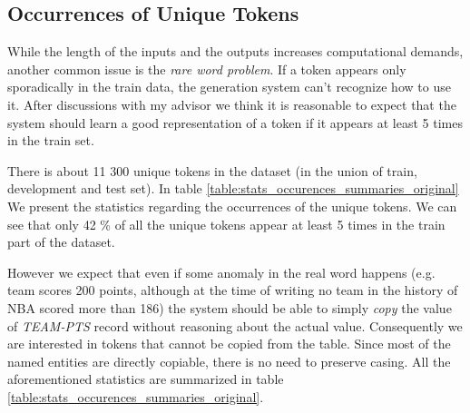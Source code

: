 \begin{table}[h!]
    \centering
    \caption{Statistics of summaries as used by \citet{wiseman2017}} \label{table:stats_length_summaries_original}
\end{table}


\subsection{Occurrences of Unique Tokens}

While the length of the inputs and the outputs increases computational demands, another common issue is the \emph{rare word problem}. If a token appears only sporadically in the train data, the generation system can't recognize how to use it. After discussions with my advisor we think it is reasonable to expect that the system should learn a good representation of a token if it appears at least 5 times in the train set.

There is about 11 300 unique tokens in the dataset (in the union of train, development and test set). In table \ref{table:stats_occurences_summaries_original} We present the statistics regarding the occurrences of the unique tokens. We can see that only 42 \% of all the unique tokens appear at least 5 times in the train part of the dataset.

However we expect that even if some anomaly in the real word happens (e.g. team scores 200 points, although at the time of writing no team in the history of NBA scored more than 186) the system should be able to simply \emph{copy} the value of \emph{TEAM-PTS} record without reasoning about the actual value. Consequently we are interested in tokens that cannot be copied from the table. Since most of the named entities are directly copiable, there is no need to preserve casing. All the aforementioned statistics are summarized in table \ref{table:stats_occurences_summaries_original}.

